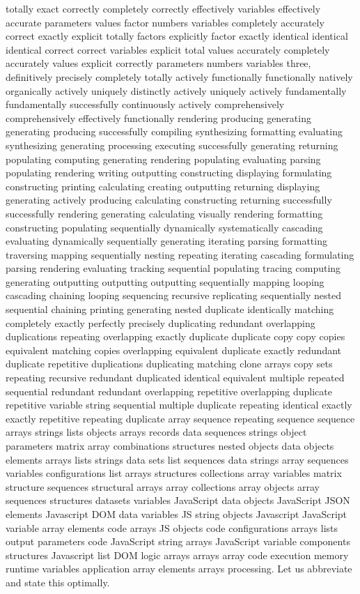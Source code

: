 totally exact correctly completely correctly effectively variables effectively accurate parameters values factor numbers variables completely accurately correct exactly explicit totally factors explicitly factor exactly identical identical identical correct correct variables explicit total values accurately completely accurately values explicit correctly parameters numbers variables three, definitively precisely completely totally actively functionally functionally natively organically actively uniquely distinctly actively uniquely actively fundamentally fundamentally successfully continuously actively comprehensively comprehensively effectively functionally rendering producing generating generating producing successfully compiling synthesizing formatting evaluating synthesizing generating processing executing successfully generating returning populating computing generating rendering populating evaluating parsing populating rendering writing outputting constructing displaying formulating constructing printing calculating creating outputting returning displaying generating actively producing calculating constructing returning successfully successfully rendering generating calculating visually rendering formatting constructing populating sequentially dynamically systematically cascading evaluating dynamically sequentially generating iterating parsing formatting traversing mapping sequentially nesting repeating iterating cascading formulating parsing rendering evaluating tracking sequential populating tracing computing generating outputting outputting outputting sequentially mapping looping cascading chaining looping sequencing recursive replicating sequentially nested sequential chaining printing generating nested duplicate identically matching completely exactly perfectly precisely duplicating redundant overlapping duplications repeating overlapping exactly duplicate duplicate copy copy copies equivalent matching copies overlapping equivalent duplicate exactly redundant duplicate repetitive duplications duplicating matching clone arrays copy sets repeating recursive redundant duplicated identical equivalent multiple repeated sequential redundant redundant overlapping repetitive overlapping duplicate repetitive variable string sequential multiple duplicate repeating identical exactly exactly repetitive repeating duplicate array sequence repeating sequence sequence arrays strings lists objects arrays records data sequences strings object parameters matrix array combinations structures nested objects data objects elements arrays lists strings data sets list sequences data strings array sequences variables configurations list arrays structures collections array variables matrix structure sequences structural arrays array collections array objects array sequences structures datasets variables JavaScript data objects JavaScript JSON elements Javascript DOM data variables JS string objects Javascript JavaScript variable array elements code arrays JS objects code configurations arrays lists output parameters code JavaScript string arrays JavaScript variable components structures Javascript list DOM logic arrays arrays array code execution memory runtime variables application array elements arrays processing. Let us abbreviate and state this optimally.

